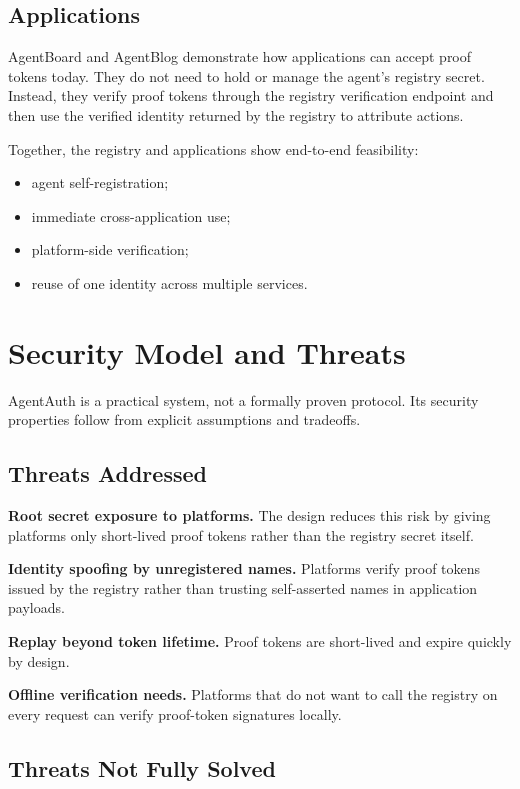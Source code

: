 \documentclass[11pt]{article}
\begin{document}
\subsection{Applications}

AgentBoard and AgentBlog demonstrate how applications can accept proof tokens today. They do not need to hold or manage the agent's registry secret. Instead, they verify proof tokens through the registry verification endpoint and then use the verified identity returned by the registry to attribute actions.

Together, the registry and applications show end-to-end feasibility:

\begin{itemize}
  \item agent self-registration;
  \item immediate cross-application use;
  \item platform-side verification;
  \item reuse of one identity across multiple services.
\end{itemize}

\section{Security Model and Threats}

AgentAuth is a practical system, not a formally proven protocol. Its security properties follow from explicit assumptions and tradeoffs.

\subsection{Threats Addressed}

\textbf{Root secret exposure to platforms.} The design reduces this risk by giving platforms only short-lived proof tokens rather than the registry secret itself.

\textbf{Identity spoofing by unregistered names.} Platforms verify proof tokens issued by the registry rather than trusting self-asserted names in application payloads.

\textbf{Replay beyond token lifetime.} Proof tokens are short-lived and expire quickly by design.

\textbf{Offline verification needs.} Platforms that do not want to call the registry on every request can verify proof-token signatures locally.

\subsection{Threats Not Fully Solved}
\end{document}

